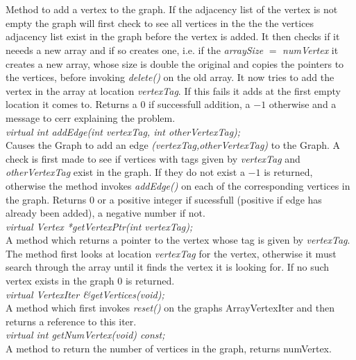   \\
  \\
Method to add a vertex to the graph. If the adjacency list
of the vertex is not empty the graph will first check to see all
vertices in the the the vertices adjacency list exist in the graph
before the vertex is added. It then checks if it neeeds a new array
and if so creates one, i.e. if the {\em arraySize} $=$ {\em
numVertex} it creates a new array, whose size is double the original
and copies the pointers to the vertices, before invoking {\em
delete()} on the old array. It now tries to add the vertex in the
array at location {\em vertexTag}. If this fails it adds at the first
empty location it comes to. Returns a 0 if successfull addition, a
$-1$ otherwise and a message to cerr explaining the problem. \\ 

{\em virtual int addEdge(int vertexTag, int otherVertexTag); } \\
Causes the Graph to add an edge {\em (vertexTag,otherVertexTag)} to
the Graph. A check is first made to see if vertices with tags given by
{\em vertexTag} and {\em otherVertexTag} exist in the graph. If they
do not exist a $-1$ is returned, otherwise the method invokes {\em
addEdge()} on each of the corresponding vertices in the 
graph. Returns $0$ or a positive integer if sucessfull (positive if
edge has already been added), a negative number if not.\\ 


{\em virtual Vertex *getVertexPtr(int vertexTag);} \\
A method which returns a pointer to the vertex whose tag is given by {\em
vertexTag}. The method first looks at location {\em vertexTag} for the
vertex, otherwise it must search through the array until it finds the
vertex it is looking for. If no such vertex exists in the graph $0$ is
returned.\\ 

{\em virtual VertexIter \&getVertices(void);} \\
A method which first invokes {\em reset()} on the graphs ArrayVertexIter
and then returns a reference to this iter.\\

{\em virtual int getNumVertex(void) const;} \\
A method to return the number of vertices in the graph, returns numVertex. \\

